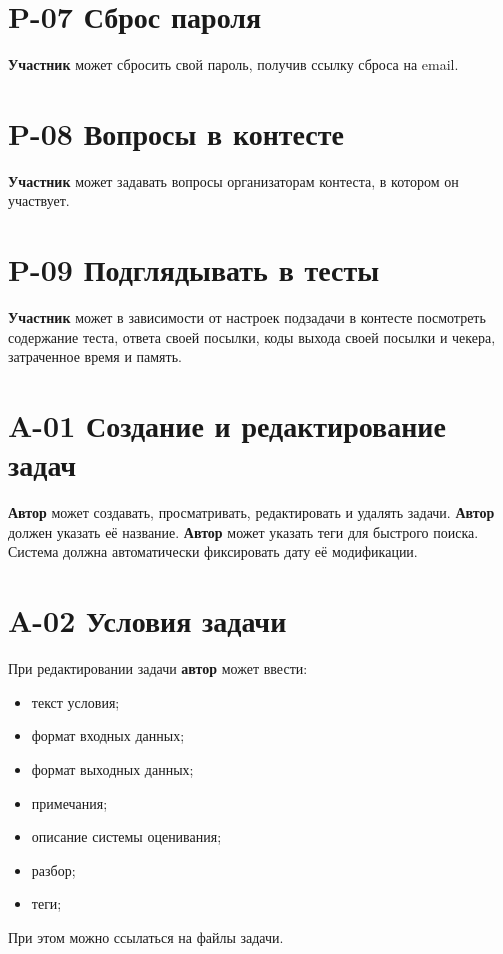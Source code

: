 \documentclass{book}
\begin{document}
\newpage \section*{P-07 Сброс пароля}
\textbf{Участник} может сбросить свой пароль, получив ссылку сброса на email.

\newpage \section*{P-08 Вопросы в контесте}
\textbf{Участник} может задавать вопросы организаторам контеста, в котором он участвует.

\newpage \section*{P-09 Подглядывать в тесты}
\textbf{Участник} может в зависимости от настроек подзадачи в контесте посмотреть
содержание теста, ответа своей посылки, коды выхода своей посылки и чекера, 
затраченное время и память.


\newpage \section*{A-01 Создание и редактирование задач}
\textbf{Автор} может создавать, просматривать, редактировать и удалять задачи. 
\textbf{Автор} должен указать её название.
\textbf{Автор} может указать теги для быстрого поиска.
Система должна автоматически фиксировать дату её модификации.

\newpage \section*{A-02 Условия задачи}
При редактировании задачи \textbf{автор} может ввести:
\begin{itemize}\setlength\itemsep{0pt}
	\item текст условия;
	\item формат входных данных;
	\item формат выходных данных;
	\item примечания;
	\item описание системы оценивания;
	\item разбор;
	\item теги;
\end{itemize}

При этом можно ссылаться на файлы задачи.
\end{document}
